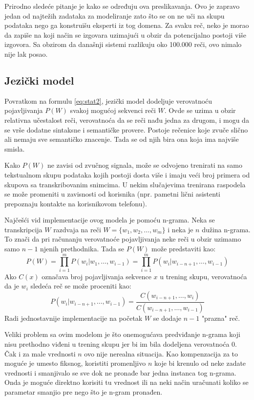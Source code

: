 \documentclass[a4paper]{article}
\begin{document}
Prirodno sledeće pitanje je kako se određuju ova preslikavanja. 
Ovo je zapravo jedan od najtežih zadataka za modeliranje zato što se on ne uči na skupu podataka nego ga konstruišu eksperti iz tog domena.
Za svaku reč, neko je morao da zapiše na koji način se izgovara uzimajući u obzir da potencijalno postoji više izgovora.
Sa obzirom da današnji sistemi razlikuju oko 100.000 reči, ovo nimalo nije lak posao.

\subsection{Jezički model}
Povratkom na formulu \ref{eq:stat2}, jezički model dodeljuje verovatnoću pojavljivanja $P(W)$ svakoj mogućoj sekvenci reči $W$.
Ovde se uzima u obzir relativna učestalost reči, verovatnoća da se reči nađu jedna za drugom, i mogu da se vrše dodatne sintaksne i semantičke provere.
Postoje rečenice koje zvuče slično ali nemaju sve semantičko znacenje.
Tada se od njih bira ona koja ima najviše smisla.

Kako $P(W)$ ne zavisi od zvučnog signala, može se odvojeno trenirati na samo tekstualnom skupu podataka kojih postoji dosta više i imaju veći broj primera od skupova sa transkribovanim snimcima.
U nekim slučajevima trenirana raspodela se može promeniti u zavisnosti od korisnika (npr. pametni lični asistenti prepoznaju kontakte na korisnikovom telefonu).

Najčešći vid implementacije ovog modela je pomoću n-grama.
Neka se transkripcija $W$ razdvaja na reči $W = \{w_1, w_2, \dots, w_m\}$ i neka je $n$ dužina n-grama.
To znači da pri računanju verovatnoće pojavljivanja neke reči u obzir uzimamo samo $n-1$ njenih prethodnika.
Tada se $P(W)$ može predstaviti kao:
\begin{equation*}
  P(W) = \prod_{i=1}^{m} P(w_i | w_1,\dots,w_{i-1}) = \prod_{i=1}^{m} P(w_i | w_{i-n+1},\dots,w_{i-1})
\end{equation*}
Ako $C(x)$ označava broj pojavljivanja sekvence $x$ u trening skupu, verovatnoća da je $w_i$ sledeća reč se može proceniti kao:
\begin{equation*}
  P(w_i | w_{i-n+1},\dots,w_{i-1}) = \frac{C(w_{i-n+1},\dots,w_i)}{C(w_{i-n+1},\dots,w_{i-1})}
\end{equation*}
Radi jednostavnije implementacije na početak $W$ se dodaje $n-1$ "prazna" reč.

Veliki problem sa ovim modelom je što onemogućava predviđanje n-grama koji nisu prethodno viđeni u trening skupu jer bi im bila dodeljena verovatnoća 0.
Čak i za male vrednosti $n$ ovo nije nerealna situacija.
Kao kompenzacija za to moguće je umesto fiksnog, koristiti promenljivo $n$ koje bi krenulo od neke zadate vrednosti i smanjivalo se sve dok ne pronađe bar jedna instanca tog n-grama.
Onda je moguće direktno korisiti tu vrednost ili na neki način uračunati koliko se parametar smanjio pre nego što je n-gram pronađen.
\end{document}
